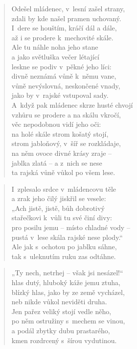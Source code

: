 \begin{verse}
Odešel mládenec, v~lesní zašel strany, \\
zdali by kde našel pramen uchovaný. \\
I~dere se houštím, kráčí dál a dále, \\
až i se prodere k~mechovité skále. \\
Ale tu náhle noha jeho stane \\
a jako světluška večer létající \\
leskne se podiv v~pěkné jeho líci: \\
divně neznámá vůně k~němu vane, \\
vůně nevýslovná, neskončené vnady, \\
jako by v~rajské vstupoval sady. \\
A~když pak mládenec skrze husté chvojí \\
vzhůru se prodere a na skálu vkročí, \\
věc nepodobnou vidí jeho oči: \\
na holé skále strom košatý stojí, \\
strom jabloňový, v~šíř se rozkládaje, \\
na něm ovoce divné krásy zraje -- \\
jablka zlatá -- a z~nich se nese \\
ta rajská vůně vůkol po všem lese.
\end{verse}

\begin{verse}
I~zplesalo srdce v~mládencovu těle \\
a zrak jeho čilý jiskřil se vesele: \\
„Ach jistě, jistě, bůh dobrotivý \\
stařečkovi k~vůli tu své činí divy: \\
pro posilu jemu -- místo chladné vody -- \\
pustá v~lese skála rajské nese plody.“ \\
Ale jak s~ochotou po jablku sáhne, \\
tak s~uleknutím ruku zas odtáhne.
\end{verse}

\begin{verse}
„Ty nech, netrhej -- však jsi nesázel!“ \\
hlas dutý, hluboký káže jemu ztuha, \\
blízký hlas, jako by ze země vycházel, \\
neb nikde vůkol neviděti druha. \\
Jen pařez veliký stojí vedle něho, \\
po něm ostružiny s~mechem se vinou, \\
a podál zbytky dubu prastarého, \\
kmen rozdrcený s~šírou vydutinou.
\end{verse}

